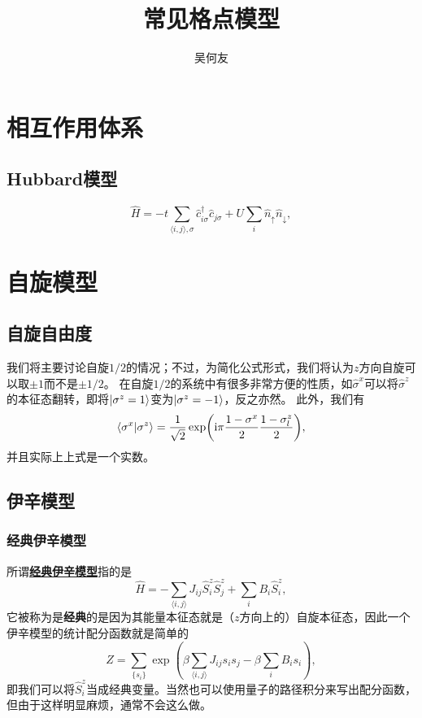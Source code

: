 \documentclass[hyperref, UTF8, a4paper]{ctexart}
\title{常见格点模型}
\author{吴何友}
\newcommand*{\ii}{\mathrm{i}}
\newcommand*{\pair}[1]{\langle #1 \rangle}
\renewcommand{\emph}[1]{\textbf{#1}}
\newcommand*{\concept}[1]{\underline{\textbf{#1}}}
\begin{document}
\maketitle

\section{相互作用体系}

\subsection{Hubbard模型}

\begin{equation}
    \hat{H} = - t \sum_{\pair{i, j}, \sigma} \hat{c}^\dagger_{i \sigma} \hat{c}_{j \sigma} + U \sum_i \hat{n}_\uparrow \hat{n}_\downarrow,
\end{equation}

\section{自旋模型}

\subsection{自旋自由度}

我们将主要讨论自旋$1/2$的情况；不过，为简化公式形式，我们将认为$z$方向自旋可以取$\pm 1$而不是$\pm 1/2$。
在自旋$1/2$的系统中有很多非常方便的性质，如$\hat{\sigma}^x$可以将$\hat{\sigma}^z$的本征态翻转，即将$\ket{\sigma^z=1}$变为$\ket{\sigma^z=-1}$，反之亦然。
此外，我们有
\begin{equation}
    \braket{\sigma^x}{\sigma^z} = \frac{1}{\sqrt{2}} \exp(\ii \pi \frac{1 - \sigma^x}{2} \frac{1 - \sigma^z_l}{2}),
\end{equation}
并且实际上上式是一个实数。

\subsection{伊辛模型}

\subsubsection{经典伊辛模型}

所谓\concept{经典伊辛模型}指的是
\begin{equation}
    \hat{H} = - \sum_{\pair{i, j}} J_{ij} \hat{S}_i^z \hat{S}_j^z + \sum_{i} B_i \hat{S}_i^z,
\end{equation}
它被称为是\emph{经典}的是因为其能量本征态就是（$z$方向上的）自旋本征态，因此一个伊辛模型的统计配分函数就是简单的
\begin{equation}
    Z = \sum_{\{s_i\}} \exp(\beta \sum_{\pair{i, j}} J_{ij} s_i s_j - \beta \sum_i B_i s_i),
\end{equation}
即我们可以将$\hat{S}_i^z$当成经典变量。当然也可以使用量子的路径积分来写出配分函数，但由于这样明显麻烦，通常不会这么做。
\end{document}
